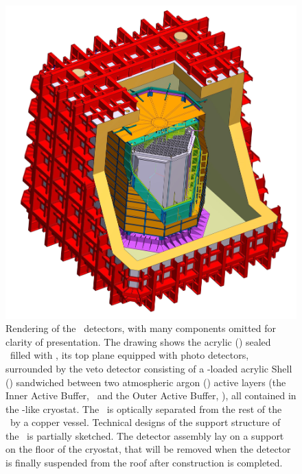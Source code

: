 \begin{figure}[t!]
\includegraphics[width=\columnwidth]{Figures/Veto-CutAway_new.jpg}
\caption[Artist rendering of the \DSks\ detectors]{Rendering of the \DSks\ detectors, with many components omitted for clarity of presentation.  The drawing shows the acrylic (\PMMA) sealed \TPC\  filled with \UAr, its top plane equipped with photo detectors, surrounded by the veto detector consisting of a -loaded acrylic Shell (\GdAS) sandwiched between two atmospheric argon (\AAr) active layers (the Inner Active Buffer, \IAB\ and the Outer Active Buffer, \OAB), all contained in the \pDUNE-like cryostat.  The \OAB\ is optically separated from the rest of the  \AAr\ by a copper vessel.  Technical designs of the support structure of the \TPC\ is partially sketched. The detector assembly lay on a support
on the floor of the cryostat, that will be removed when the detector is finally suspended from the roof after construction is completed.}
\label{fig:DSk3D}
\end{figure}




